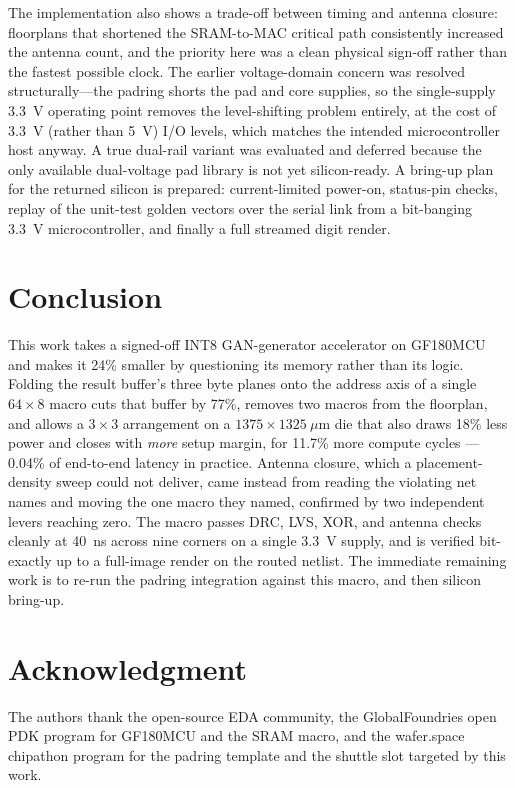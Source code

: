 \documentclass[conference,a4paper]{APSIPA2026}
\begin{document}
The implementation also shows a trade-off between timing and antenna closure: floorplans that shortened the SRAM-to-MAC critical path consistently increased the antenna count, and the priority here was a clean physical sign-off rather than the fastest possible clock. The earlier voltage-domain concern was resolved structurally---the padring shorts the pad and core supplies, so the single-supply 3.3~V operating point removes the level-shifting problem entirely, at the cost of 3.3~V (rather than 5~V) I/O levels, which matches the intended microcontroller host anyway. A true dual-rail variant was evaluated and deferred because the only available dual-voltage pad library is not yet silicon-ready. A bring-up plan for the returned silicon is prepared: current-limited power-on, status-pin checks, replay of the unit-test golden vectors over the serial link from a bit-banging 3.3~V microcontroller, and finally a full streamed digit render.

\section{Conclusion}\label{sec:concl}
This work takes a signed-off INT8 GAN-generator accelerator on GF180MCU and makes it 24\% smaller by questioning its memory rather than its logic. Folding the result buffer's three byte planes onto the address axis of a single $64\times8$ macro cuts that buffer by 77\%, removes two macros from the floorplan, and allows a $3\times3$ arrangement on a $1375\times1325~\mu$m die that also draws 18\% less power and closes with \emph{more} setup margin, for 11.7\% more compute cycles --- 0.04\% of end-to-end latency in practice. Antenna closure, which a placement-density sweep could not deliver, came instead from reading the violating net names and moving the one macro they named, confirmed by two independent levers reaching zero. The macro passes DRC, LVS, XOR, and antenna checks cleanly at 40~ns across nine corners on a single 3.3~V supply, and is verified bit-exactly up to a full-image render on the routed netlist. The immediate remaining work is to re-run the padring integration against this macro, and then silicon bring-up.

\section*{Acknowledgment}
The authors thank the open-source EDA community, the GlobalFoundries open PDK program for GF180MCU and the SRAM macro, and the wafer.space chipathon program for the padring template and the shuttle slot targeted by this work.
\end{document}
